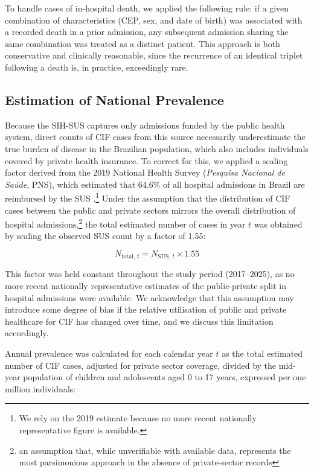 \documentclass[pdflatex,sn-mathphys-num]{sn-jnl}
\theoremstyle{thmstyleone}%
\theoremstyle{thmstyletwo}%
\theoremstyle{thmstylethree}%
\begin{document}
To handle cases of in-hospital death, we applied the following rule: if a given combination of characteristics (CEP, sex, and date of birth) was associated with a recorded death in a prior admission, any subsequent admission sharing the same combination was treated as a distinct patient. This approach is both conservative and clinically reasonable, since the recurrence of an identical triplet following a death is, in practice, exceedingly rare.

\subsection*{Estimation of National Prevalence}
Because the SIH-SUS captures only admissions funded by the public health system, direct counts of CIF cases from this source necessarily underestimate the true burden of disease in the Brazilian population, which also includes individuals covered by private health insurance. To correct for this, we applied a scaling factor derived from the 2019 National Health Survey (\textit{Pesquisa Nacional de Sa\'{u}de}, PNS), which estimated that 64.6\% of all hospital admissions in Brazil are reimbursed by the SUS \cite{ibge2020pns}.\footnote{We rely on the 2019 estimate because no more recent nationally representative figure is available.} Under the assumption that the distribution of CIF cases between the public and private sectors mirrors the overall distribution of hospital admissions,\footnote{an assumption that, while unverifiable with available data, represents the most parsimonious approach in the absence of private-sector records} the total estimated number of cases in year $t$ was obtained by scaling the observed SUS count by a factor of 1.55:

\begin{equation}
    N_{\text{total},\, t} = N_{\text{SUS},\, t} \times 1.55
\end{equation}

This factor was held constant throughout the study period (2017--2025), as no more recent nationally representative estimates of the public-private split in hospital admissions were available. We acknowledge that this assumption may introduce some degree of bias if the relative utilisation of public and private healthcare for CIF has changed over time, and we discuss this limitation accordingly.

Annual prevalence was calculated for each calendar year $t$ as the total estimated number of CIF cases, adjusted for private sector coverage, divided by the mid-year population of children and adolescents aged 0 to 17 years, expressed per one million individuals:
\end{document}
